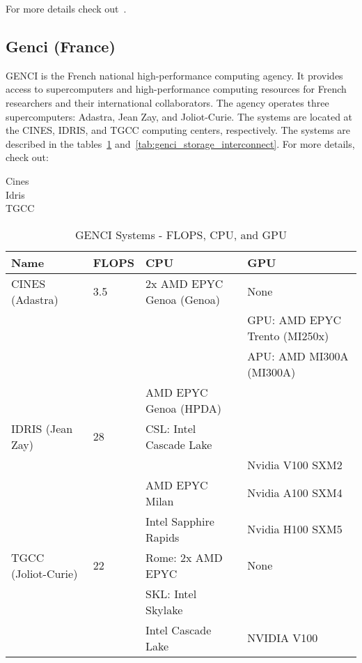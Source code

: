For more details check out~\cite{eurohpc_supercomputers}.

\subsection*{Genci (France)}
\label{sec:arch:genci}

\ac{GENCI} is the French national high-performance computing agency. It provides access to supercomputers and high-performance computing resources for French researchers and their international collaborators. The agency operates three supercomputers: Adastra, Jean Zay, and Joliot-Curie. The systems are located at the CINES, IDRIS, and TGCC computing centers, respectively. The systems are described in the tables~\ref{tab:genci_flops_cpu_gpu} and~\ref{tab:genci_storage_interconnect}.
For more details, check out:
\begin{description}
    \item[Cines] 
    \item[Idris] 
    \item[TGCC]  
\end{description}


    \begin{table}[!ht]
        \centering
        \begin{tabular}{l l l l}
        \toprule
        \textbf{Name} & \textbf{FLOPS} & \textbf{CPU} & \textbf{GPU} \\
        \midrule
        CINES (Adastra) & 3.5 & 2x AMD EPYC Genoa (Genoa) & None \\
        & & & GPU: AMD EPYC Trento (MI250x)  \\
        & & & APU: AMD MI300A (MI300A)  \\
        & & AMD EPYC Genoa (HPDA) & \\
        IDRIS (Jean Zay) & 28 & CSL: Intel Cascade Lake & \\
        & &                & Nvidia V100 SXM2 \\
        & & AMD EPYC Milan &  Nvidia A100 SXM4\\
        & & Intel Sapphire Rapids & Nvidia H100 SXM5        \\
        TGCC (Joliot-Curie) & 22 & Rome: 2x AMD EPYC  & None \\
        & & SKL:  Intel Skylake & \\
        & & Intel Cascade Lake & NVIDIA V100 \\
        \bottomrule
        \end{tabular}
        \caption{GENCI Systems - FLOPS, CPU, and GPU}
        \label{tab:genci_flops_cpu_gpu}
    \end{table}


